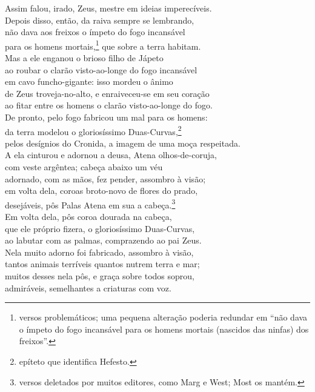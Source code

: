 \quad{}Assim falou, irado, Zeus, mestre em ideias imperecíveis.\\
Depois disso, então, da raiva sempre se lembrando,\\
não dava aos freixos o ímpeto do fogo incansável\\
para os homens mortais,\footnote{versos problemáticos; uma pequena alteração poderia redundar em
``não dava o ímpeto do fogo incansável para os homens mortais (nascidos
das ninfas) dos freixos''.} que sobre a terra habitam.\\
Mas a ele enganou o brioso filho de Jápeto \\
ao roubar o clarão visto-ao-longe do fogo incansável\\
em cavo funcho-gigante: isso mordeu o ânimo\\
de Zeus troveja-no-alto, e enraiveceu-se em seu coração\\
ao fitar entre os homens o clarão visto-ao-longe do fogo.\\
De pronto, pelo fogo fabricou um mal para os homens: \\
da terra modelou o gloriosíssimo Duas-Curvas,\footnote{epíteto que identifica Hefesto.}\\
pelos desígnios do Cronida, a imagem de uma moça respeitada.\\
A ela cinturou e adornou a deusa, Atena olhos-de-coruja,\\
com veste argêntea; cabeça abaixo um véu\\
adornado, com as mãos, fez pender, assombro à visão; \\
em volta dela, coroas broto-novo de flores do prado,\\
desejáveis, pôs Palas Atena em sua a cabeça.\footnote{versos deletados por muitos editores, como Marg e West; Most os mantém.}\\
Em volta dela, pôs coroa dourada na cabeça,\\
que ele próprio fizera, o gloriosíssimo Duas-Curvas,\\
ao labutar com as palmas, comprazendo ao pai Zeus. \\
Nela muito adorno foi fabricado, assombro à visão,\\
tantos animais terríveis quantos nutrem terra e mar;\\
muitos desses nela pôs, e graça sobre todos soprou,\\
admiráveis, semelhantes a criaturas com voz.

